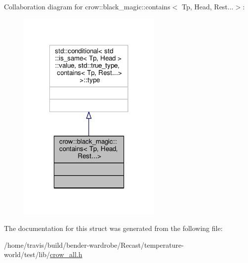 Collaboration diagram for crow\-:\-:black\-\_\-magic\-:\-:contains$<$ Tp, Head, Rest...$>$\-:
\nopagebreak
\begin{figure}[H]
\begin{center}
\leavevmode
\includegraphics[width=198pt]{structcrow_1_1black__magic_1_1contains_3_01_tp_00_01_head_00_01_rest_8_8_8_4__coll__graph}
\end{center}
\end{figure}


The documentation for this struct was generated from the following file\-:\begin{DoxyCompactItemize}
\item 
/home/travis/build/bender-\/wardrobe/\-Recast/temperature-\/world/test/lib/\hyperlink{crow__all_8h}{crow\-\_\-all.\-h}\end{DoxyCompactItemize}
